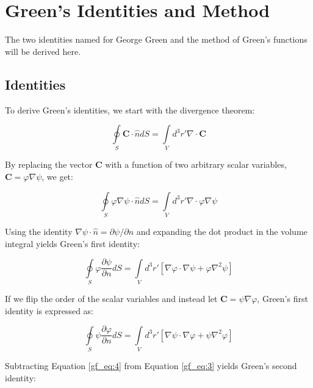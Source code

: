 \section {Green's Identities and Method}
The two identities named for George Green and the method of Green’s functions will be derived here.

\subsection{Identities}
To derive Green’s identities, we start with the divergence theorem:

\begin{equation}
\oint\limits_{S} \mathbf{C} \cdot \hat{n} dS = \int\limits_{V}d^3r'\nabla \cdot \mathbf{C}
\label{gf_eq:1}
\end{equation}
\renewcommand{\baselinestretch}{2} \small\normalsize

By replacing the vector $\mathbf{C}$ with a function of two arbitrary scalar variables, $\mathbf{C}=\varphi\nabla\psi$, we get:

\begin{equation}
\oint\limits_{S} \varphi\nabla\psi \cdot \hat{n} dS = \int\limits_{V}d^3r'\nabla \cdot \varphi\nabla\psi
\label{gf_eq:2}
\end{equation}
\renewcommand{\baselinestretch}{2} \small\normalsize

Using the identity $\nabla\psi\cdot \hat{n} = \partial \psi/\partial n$ and expanding the dot product in the volume integral yields Green's first identity:

\begin{equation}
\boxed{\oint\limits_{S} \varphi\frac{\partial \psi}{\partial n} dS = \int\limits_{V}d^3r' \left[ \nabla\varphi \cdot \nabla\psi +\varphi \nabla^2 \psi\right]}
\label{gf_eq:3}
\end{equation}
\renewcommand{\baselinestretch}{2} \small\normalsize

If we flip the order of the scalar variables and instead let $\mathbf{C}=\psi\nabla\varphi$, Green's first identity is expressed as:

\begin{equation}
\oint\limits_{S} \psi\frac{\partial \varphi}{\partial n} dS = \int\limits_{V}d^3r' \left[ \nabla\psi \cdot \nabla\varphi +\psi \nabla^2 \varphi\right]
\label{gf_eq:4}
\end{equation}
\renewcommand{\baselinestretch}{2} \small\normalsize

\noindent Subtracting Equation \ref{gf_eq:4} from Equation \ref{gf_eq:3} yields Green's second identity:

